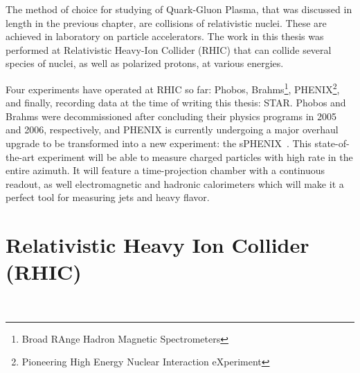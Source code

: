 The method of choice for studying of Quark-Gluon Plasma, that was discussed in length in the previous chapter, are collisions of relativistic nuclei. These are achieved in laboratory on particle accelerators. The work in this thesis was performed at Relativistic Heavy-Ion Collider (RHIC) that can collide several species of nuclei, as well as polarized protons, at various energies. 


Four experiments have operated at RHIC so far: Phobos, Brahms\footnote{Broad RAnge Hadron Magnetic Spectrometers}, PHENIX\footnote{Pioneering High Energy Nuclear Interaction eXperiment}, and finally, recording data at the time of writing this thesis: STAR. Phobos and Brahms were decommissioned after concluding their physics programs in 2005 and 2006, respectively, and PHENIX is currently undergoing a major overhaul upgrade to be transformed into a new experiment: the sPHENIX~\cite{sphenix}. This state-of-the-art experiment will be able to measure charged particles with high rate in the entire azimuth. It will feature a time-projection chamber with a continuous readout, as well electromagnetic and hadronic calorimeters which will make it a perfect tool for measuring jets and heavy flavor.


\section{Relativistic Heavy Ion Collider (RHIC)\label{RHIC}}\

